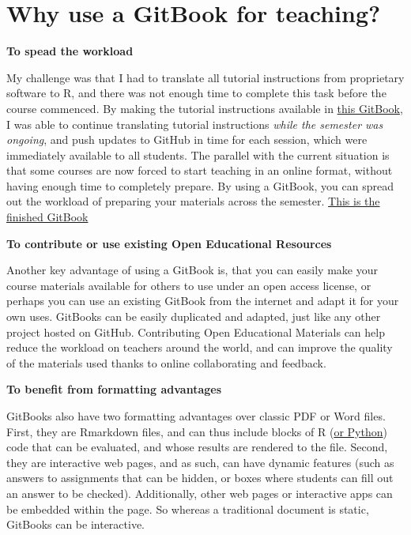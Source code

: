 \documentclass[
]{book}
\begin{document}
\hypertarget{why-use-a-gitbook-for-teaching}{%
\section{Why use a GitBook for teaching?}\label{why-use-a-gitbook-for-teaching}}

\textbf{To spead the workload}

My challenge was that I had to translate all tutorial instructions from proprietary software to R, and there was not enough time to complete this task before the course commenced. By making the tutorial instructions available in \href{https://cjvanlissa.github.io/TCSM/}{this GitBook}, I was able to continue translating tutorial instructions \emph{while the semester was ongoing}, and push updates to GitHub in time for each session, which were immediately available to all students. The parallel with the current situation is that some courses are now forced to start teaching in an online format, without having enough time to completely prepare. By using a GitBook, you can spread out the workload of preparing your materials across the semester. \href{https://cjvanlissa.github.io/TCSM/}{This is the finished GitBook}

\textbf{To contribute or use existing Open Educational Resources}

Another key advantage of using a GitBook is, that you can easily make your course materials available for others to use under an open access license, or perhaps you can use an existing GitBook from the internet and adapt it for your own uses. GitBooks can be easily duplicated and adapted, just like any other project hosted on GitHub. Contributing Open Educational Materials can help reduce the workload on teachers around the world, and can improve the quality of the materials used thanks to online collaborating and feedback.

\textbf{To benefit from formatting advantages}

GitBooks also have two formatting advantages over classic PDF or Word files. First, they are Rmarkdown files, and can thus include blocks of R (\href{https://rstudio.github.io/reticulate/articles/r_markdown.html}{or Python}) code that can be evaluated, and whose results are rendered to the file. Second, they are interactive web pages, and as such, can have dynamic features (such as answers to assignments that can be hidden, or boxes where students can fill out an answer to be checked). Additionally, other web pages or interactive apps can be embedded within the page. So whereas a traditional document is static, GitBooks can be interactive.
\end{document}
